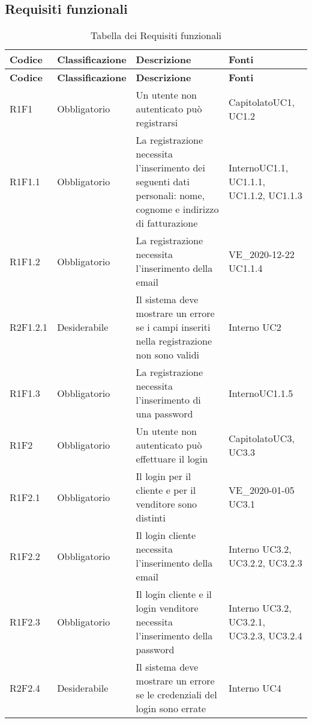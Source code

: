 \subsection{Requisiti funzionali} 


{


\centering
\renewcommand{\arraystretch}{2}
\begin{longtable}{C{2.5cm} C{2.8cm} C{6.7cm} C{2.5cm}}
\caption{Tabella dei Requisiti funzionali}\\
\textbf{Codice} &
\textbf{Classificazione}&
\textbf{Descrizione}&
\textbf{Fonti}\\
\endfirsthead
{}
\textbf{Codice} &
\textbf{Classificazione}&
\textbf{Descrizione}&
\textbf{Fonti}\\
\endhead


R1F1 & Obbligatorio & Un utente non autenticato può registrarsi & Capitolato\newline UC1, UC1.2 \\
R1F1.1 & Obbligatorio & La registrazione necessita l'inserimento dei seguenti dati personali: nome, cognome e indirizzo di fatturazione & Interno\newline UC1.1, UC1.1.1, UC1.1.2, UC1.1.3 \\
R1F1.2 & Obbligatorio & La registrazione necessita l'inserimento della email & VE\_2020-12-22 \newline UC1.1.4 \\
R2F1.2.1 & Desiderabile & Il sistema deve mostrare un errore se i campi inseriti nella registrazione non sono validi & Interno \newline UC2 \\
R1F1.3 & Obbligatorio & La registrazione necessita l'inserimento di una password & Interno\newline UC1.1.5 \\


R1F2 & Obbligatorio & Un utente non autenticato può effettuare il login & Capitolato\newline UC3, UC3.3 \\
R1F2.1 & Obbligatorio & Il login per il cliente e per il venditore sono distinti & VE\_2020-01-05 \newline UC3.1 \\
R1F2.2 & Obbligatorio & Il login cliente necessita l'inserimento della email & Interno \newline UC3.2, UC3.2.2, UC3.2.3 \\
R1F2.3 & Obbligatorio & Il login cliente e il login venditore necessita l'inserimento della password & Interno \newline UC3.2, UC3.2.1, UC3.2.3, UC3.2.4  \\
R2F2.4 & Desiderabile & Il sistema deve mostrare un errore se le credenziali del login sono errate & Interno \newline UC4 \\


\end{longtable}}
